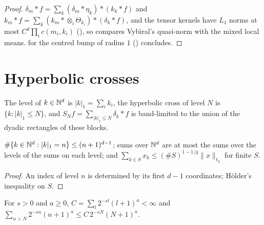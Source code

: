 \begin{proof}
\leanok
$\delta_m * f = \sum_k (\delta_m * \eta_k) * (k_k * f)$ and
$k_m * f = \sum_k (k_m * \otimes_i \Theta_{k_i}) * (\delta_k * f)$, and the tensor kernels have
$L_1$ norms at most $C^d \prod_i c(m_i, k_i)$ (), so
 compares Vyb\'{\i}ral's quasi-norm with the mixed local means.
 for the centred bump of radius $1$ ()
concludes.
\end{proof}

\section{Hyperbolic crosses}

\begin{definition}
\label{def:hyperbolic-cross}
\leanok
{}
The level of $k \in \mathbb{N}^d$ is $|k|_1 = \sum_i k_i$, the hyperbolic cross of level $N$ is
$\{k : |k|_1 \leq N\}$, and $S_N f = \sum_{|k|_1 \leq N} \delta_k * f$ is band-limited to the union
of the dyadic rectangles of these blocks.
\end{definition}

\begin{lemma}
\label{lem:level-count}
\leanok
{}
$\#\{k \in \mathbb{N}^d : |k|_1 = n\} \leq (n + 1)^{d-1}$; sums over $\mathbb{N}^d$ are at most the sums over the
levels of the sums on each level; and $\sum_{k \in S} x_k \leq (\# S)^{1 - 1/q} \|x\|_{\ell_q}$ for
finite $S$.
\end{lemma}

\begin{proof}
\leanok
An index of level $n$ is determined by its first $d - 1$ coordinates; Hölder's inequality on $S$.
\end{proof}

\begin{lemma}
\label{lem:rate-series}
\leanok
For $s > 0$ and $a \geq 0$, $C = \sum_l 2^{-sl} (l + 1)^a < \infty$ and
$\sum_{n > N} 2^{-sn} (n + 1)^a \leq C \, 2^{-sN} (N + 1)^a$.
\end{lemma}

